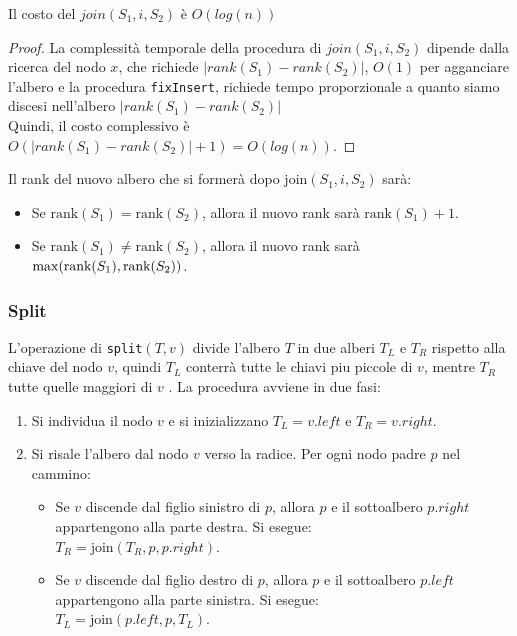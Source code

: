\begin{definition}
    Il costo del  $join(S_1, i, S_2)$ è $O(log(n))$
\end{definition}
\begin{proof}
    La complessità temporale della procedura di $join(S_1, i, S_2)$ dipende dalla ricerca del nodo $x$, che richiede $|rank(S_1) - rank(S_2)|$, $O(1)$ per agganciare l'albero e la procedura \texttt{fixInsert}, richiede tempo proporzionale a quanto siamo discesi nell'albero $|rank(S_1) -rank(S_2)|$ \\
    Quindi, il costo complessivo è $O(|rank(S_1) - rank(S_2)| +1) = O(log(n))$.
\end{proof}

\begin{kaobox}[frametitle=Note] 
    Il rank del nuovo albero che si formerà dopo $\text{join}(S_1, i, S_2)$ sarà:
    \begin{itemize}
        \item Se $\text{rank}(S_1) = \text{rank}(S_2)$, allora il nuovo rank sarà $\text{rank}(S_1) + 1$.
        \item Se $\text{rank}(S_1) \neq \text{rank}(S_2)$, allora il nuovo rank sarà $\max(\text{rank}(S_1), \\\text{rank}(S_2))$.
    \end{itemize}
\end{kaobox}
\newpage
\subsubsection{Split}
L'operazione di \texttt{split}$(T, v)$ divide l'albero $T$ in due alberi $T_L$ e $T_R$ rispetto alla chiave del nodo $v$, quindi $T_L$ conterrà tutte le chiavi piu piccole di $v$, mentre $T_R$ tutte quelle maggiori di $v$ . La procedura avviene in due fasi:
\begin{enumerate}
    \item Si individua il nodo $v$ e si inizializzano $T_L = v.left$ e $T_R = v.right$.
    \item Si risale l'albero dal nodo $v$ verso la radice. Per ogni nodo padre $p$ nel cammino:
    \begin{itemize}
        \item Se $v$ discende dal figlio sinistro di $p$, allora $p$ e il sottoalbero $p.right$ appartengono alla parte destra. Si esegue: \\ $T_R = \text{join}(T_R, p, p.right)$.
        \item Se $v$ discende dal figlio destro di $p$, allora $p$ e il sottoalbero $p.left$ appartengono alla parte sinistra. Si esegue: \\ $T_L = \text{join}(p.left, p, T_L)$.
    \end{itemize}
\end{enumerate}

